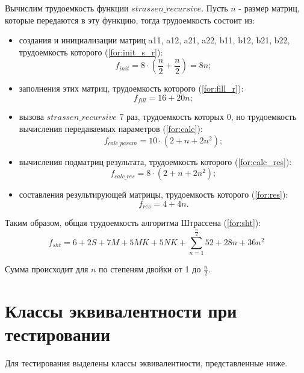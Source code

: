 Вычислим трудоемкость функции $strassen\_recursive$. Пусть $n$ - размер матриц, которые передаются в эту функцию, тогда трудоемкость состоит из:
\begin{itemize}
	\item создания и инициализации матриц a11, a12, a21, a22, b11, b12, b21, b22, трудоемкость которого (\ref{for:init_s_r}):
	\begin{equation}
		\label{for:init_s_r}
		f_{init} = 8 \cdot (\frac{n}{2} + \frac{n}{2}) = 8n;
	\end{equation}
	\item заполнения этих матриц, трудоемкость которого (\ref{for:fill_r}):
	\begin{equation}
		\label{for:fill_r}
		f_{fill} = 16 + 20n;
	\end{equation}
	\item вызова $strassen\_recursive$ 7 раз, трудоемкость которых 0, но трудоемкость вычисления передаваемых параметров (\ref{for:calc}):
	\begin{equation}
		\label{for:calc}
		f_{calc\_param} = 10 \cdot (2 + n + 2n^2);
	\end{equation}
	\item вычисления подматриц результата, трудоемкость которого (\ref{for:calc_res}):
	\begin{equation}
		\label{for:calc_res}
		f_{calc\_res} = 8 \cdot (2 + n + 2n^2);
	\end{equation}
	\item составления результирующей матрицы, трудоемкость которого (\ref{for:res}):
	\begin{equation}
		\label{for:res}
		f_{res} = 4 + 4n.
	\end{equation}
\end{itemize}

Таким образом, общая трудоемкость алгоритма Штрассена (\ref{for:sht}):
\begin{equation}
	\label{for:sht}
	f_{sht} = 6 + 2S + 7M + 5MK + 5NK + \sum_{n=1}^{\frac{n}{2}}{52 + 28n + 36n^2}
\end{equation}

Сумма происходит для $n$ по степеням двойки от 1 до $\frac{n}{2}$.

\section{Классы эквивалентности при тестировании}

Для тестирования выделены классы эквивалентности, представленные ниже.

